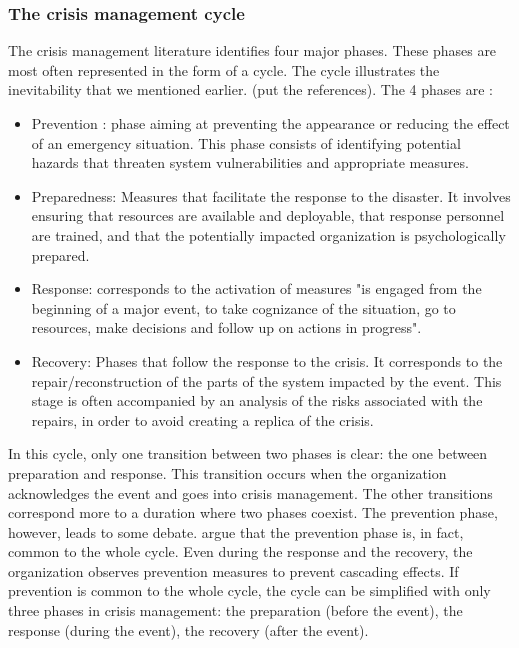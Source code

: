 \subsubsection{The crisis management cycle}
The crisis management literature identifies four major phases.
These phases are most often represented in the form of a cycle.
The cycle illustrates the inevitability that we mentioned earlier. (put the references).
The 4 phases are :
\begin{itemize}
    \item Prevention : phase aiming at preventing the appearance or reducing the effect of an emergency situation.
          This phase consists of identifying potential hazards that threaten system vulnerabilities and appropriate measures.
    \item Preparedness: Measures that facilitate the response to the disaster. It involves ensuring that resources are available and deployable, that response personnel are trained, and that the potentially impacted organization is psychologically prepared.
    \item Response: corresponds to the activation of measures "is engaged from the beginning of a major event, to take cognizance of the situation, go to resources, make decisions
          and follow up on actions in progress".
    \item Recovery: Phases that follow the response to the crisis. It corresponds to the repair/reconstruction of the parts of the system impacted by the event.
          This stage is often accompanied by an analysis of the risks associated with the repairs, in order to avoid creating a replica of the crisis.
\end{itemize}
In this cycle, only one transition between two phases is clear: the one between preparation and response.
This transition occurs when the organization acknowledges the event and goes into crisis management.
The other transitions correspond more to a duration where two phases coexist.
The prevention phase, however, leads to some debate.
\cite{benabenCollaborative2014} argue that the prevention phase is, in fact, common to the whole cycle.
Even during the response and the recovery, the organization observes prevention measures to prevent cascading effects.
If prevention is common to the whole cycle, the cycle can be simplified with only three phases in crisis management: the preparation (before the event), the response (during the event), the recovery (after the event).

